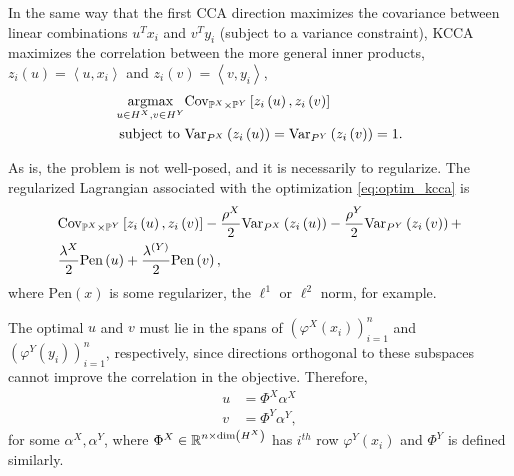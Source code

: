 \documentclass{article}
\begin{document}
In the same way that the first CCA direction maximizes the covariance between
linear combinations $u^{T}x_{i}$ and $v^{T}y_{i}$ (subject to a variance
constraint), KCCA maximizes the correlation between the more general inner
products, $z_{i}\left(u\right) = \left<u, x_{i}\right>$ and $z_{i}\left(v\right)
= \left<v, y_{i}\right>$,
\begin{align}
  \mathop\mathrm{arg max}_{u \in H^{X}, v \in H^{Y}}
  &\mathrm{Cov}_{\mathbb{P}^{X} \times \mathbb{P}^{Y}}\left[{z_{i}\left(u\right), z_{i}\left(v\right)}\right] \label{eq:optim_kcca}\\
\text{subject to } &\mathrm{Var}_{P^{X}}\left(z_{i}\left(u\right)\right) = \mathrm{Var}_{P^{Y}}\left(z_{i}\left(v\right)\right) = 1. \nonumber
\end{align}

As is, the problem is not well-posed, and it is necessarily to regularize. The
regularized Lagrangian associated with the optimization \ref{eq:optim_kcca} is
\begin{align}
  &\mathrm{Cov}_{\mathbb{P}^{X} \times \mathbb{P}^{Y}}\left[{z_{i}\left(u\right), z_{i}\left(v\right)}\right] -
  \frac{\rho^{X}}{2}\mathrm{Var}_{P^{X}}\left(z_{i}\left(u\right)\right) -
  \frac{\rho^{Y}}{2}\mathrm{Var}_{P^{Y}}\left(z_{i}\left(v\right)\right) + \label{eq:lagrangian_kcca}\\
  &\frac{\lambda^{X}}{2}\text{Pen}\left(u\right) + \frac{\lambda^{(Y)}}{2}\text{Pen}\left(v\right), \nonumber
\end{align}
where $\text{Pen}\left(x\right)$ is some regularizer, the $\ell^{1}$ or
$\ell^{2}$ norm, for example.

The optimal $u$ and $v$ must lie in the spans of
$\left(\varphi^{X}\left(x_{i}\right)\right)_{i =1 }^{n}$ and
$\left(\varphi^{Y}\left(y_{i}\right)\right)_{i =1 }^{n}$, respectively, since
directions orthogonal to these subspaces cannot improve the correlation in the
objective. Therefore,
\begin{align*}
u &= \Phi^{X} \alpha^{X} \\
v &= \Phi^{Y} \alpha^{Y},
\end{align*}
for some $\alpha^{X}, \alpha^{Y}$, where $\Phi^{X} \in \mathbb{R}^{n \times
  \text{dim}\left(H^{X}\right)}$ has $i^{th}$ row
$\varphi^{Y}\left(x_{i}\right)$ and $\Phi^{Y}$ is defined similarly.
\end{document}
